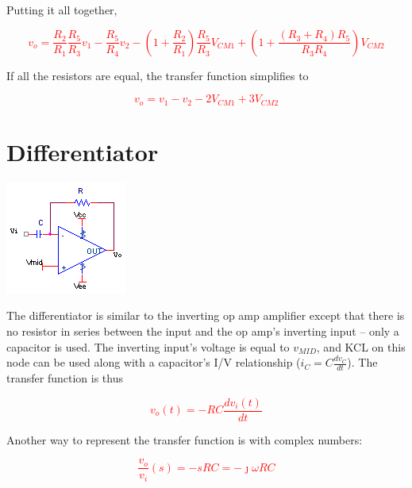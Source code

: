 \noindent Putting it all together,

\textcolor{red}{
\begin{equation}
v_{o} = \frac{R_{2}}{R_{1}}\frac{R_{5}}{R_{3}}v_{1} - \frac{R_{5}}{R_{4}}v_{2} - (1+\frac{R_{2}}{R_{1}})\frac{R_{5}}{R_{3}}V_{CM1} + (1+\frac{(R_{3}+R_{4})R_{5}}{R_{3}R_{4}})V_{CM2}
\label{eq:highcmdifferenceamplifier}
\end{equation}
}

\noindent If all the resistors are equal, the transfer function simplifies to

\textcolor{red}{
\begin{equation}
v_{o} = v_{1}-v_{2}-2V_{CM1}+3V_{CM2}
\label{eq:highcmdifferenceamplifier_simple}
\end{equation}
}

\section{Differentiator}
\begin{center}
	\includegraphics{schematics/differentiator.PNG}
\end{center}
The differentiator is similar to the inverting op amp amplifier except that there is no resistor in series between the input and the op amp's inverting input -- only a capacitor is used. The inverting input's voltage is equal to $v_{MID}$, and KCL on this node can be used along with a capacitor's I/V relationship ($i_{C} = C\frac{dv_{C}}{dt}$). The transfer function is thus

\textcolor{red}{
\begin{equation}
v_{o}(t) = -RC\frac{dv_{i}(t)}{dt}
\label{differentiator}
\end{equation}
}

\noindent Another way to represent the transfer function is with complex numbers:

\textcolor{red}{
\begin{equation}
\frac{v_{o}}{v_{i}}(s) = -sRC = -\jmath \omega RC
\label{eq:differentiator_complex}
\end{equation}
}

